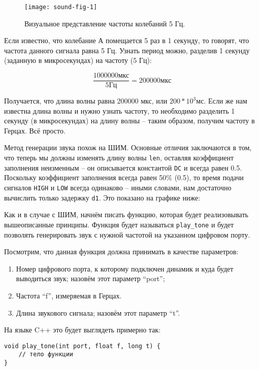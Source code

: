 \documentclass[../sparc.tex]{subfiles}
\begin{document}
\begin{figure}[h]
  \centering
  \texttt{[image: sound-fig-1]}
  \caption{Визуальное представление частоты колебаний 5 Гц.}
  \label{fig:sound-fig-1}
\end{figure}

Если известно, что колебание А помещается 5 раз в 1 секунду, то говорят, что
частота данного сигнала равна 5 Гц. Узнать период можно, разделив 1 секунду
(заданную в микросекундах) на частоту (5 Гц):

\begin{equation}
  \frac{1000000 \mbox{мкс}}{5 \mbox{Гц}} = 200000 \mbox{мкс}
\end{equation}

Получается, что длина волны равна 200000 мкс, или $ 200 * 10^3 \mbox{мс} $. Если
же нам известна длина волны и нужно узнать частоту, то необходимо разделить 1
секунду (в микросекундах) на длину волны -- таким образом, получим частоту в
Герцах. Всё просто.

Метод генерации звука похож на \gls{ШИМ}. Основные отличия заключаются в том,
что теперь мы должны изменять длину волны \texttt{len}, оставляя коэффициент
заполнения неизменным -- он описывается константой \texttt{DC} и всегда равен
0.5. Поскольку коэффициент заполнения всегда равен 50\% (0.5), то время подачи
сигналов \texttt{HIGH} и \texttt{LOW} всегда одинаково -- иными словами, нам
достаточно вычислить только задержку \texttt{d1}. Это показано на графике ниже:

Как и в случае с ШИМ, начнём писать функцию, которая будет реализовывать
вышеописанные принципы. Функция будет называться \texttt{play\_tone} и будет
позволять генерировать звук с нужной частотой на указанном цифровом порту.

Посмотрим, что данная функция должна принимать в качестве параметров:
\begin{enumerate}
\item Номер цифрового порта, к которому подключен динамик и куда будет
  выводиться звук; назовём этот параметр ``port'';
\item Частота ``f'', измеряемая в Герцах. 
\item Длина звукового сигнала; назовём этот параметр ``t''.
\end{enumerate}

На языке C++ это будет выглядеть примерно так:
\begin{verbatim}
void play_tone(int port, float f, long t) {
    // тело функции
}
\end{verbatim}
\end{document}
